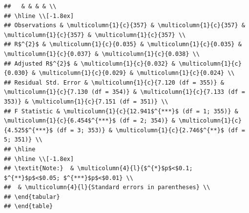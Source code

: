\documentclass[
  12pt,
  landscape]{article}
\begin{document}
\begin{verbatim}
##   & & & & \\ 
## \hline \\[-1.8ex] 
## Observations & \multicolumn{1}{c}{357} & \multicolumn{1}{c}{357} & \multicolumn{1}{c}{357} & \multicolumn{1}{c}{357} \\ 
## R$^{2}$ & \multicolumn{1}{c}{0.035} & \multicolumn{1}{c}{0.035} & \multicolumn{1}{c}{0.037} & \multicolumn{1}{c}{0.038} \\ 
## Adjusted R$^{2}$ & \multicolumn{1}{c}{0.032} & \multicolumn{1}{c}{0.030} & \multicolumn{1}{c}{0.029} & \multicolumn{1}{c}{0.024} \\ 
## Residual Std. Error & \multicolumn{1}{c}{7.120 (df = 355)} & \multicolumn{1}{c}{7.130 (df = 354)} & \multicolumn{1}{c}{7.133 (df = 353)} & \multicolumn{1}{c}{7.151 (df = 351)} \\ 
## F Statistic & \multicolumn{1}{c}{12.941$^{***}$ (df = 1; 355)} & \multicolumn{1}{c}{6.454$^{***}$ (df = 2; 354)} & \multicolumn{1}{c}{4.525$^{***}$ (df = 3; 353)} & \multicolumn{1}{c}{2.746$^{**}$ (df = 5; 351)} \\ 
## \hline 
## \hline \\[-1.8ex] 
## \textit{Note:}  & \multicolumn{4}{l}{$^{*}$p$<$0.1; $^{**}$p$<$0.05; $^{***}$p$<$0.01} \\ 
##  & \multicolumn{4}{l}{Standard errors in parentheses} \\ 
## \end{tabular} 
## \end{table}
\end{verbatim}
\end{document}

